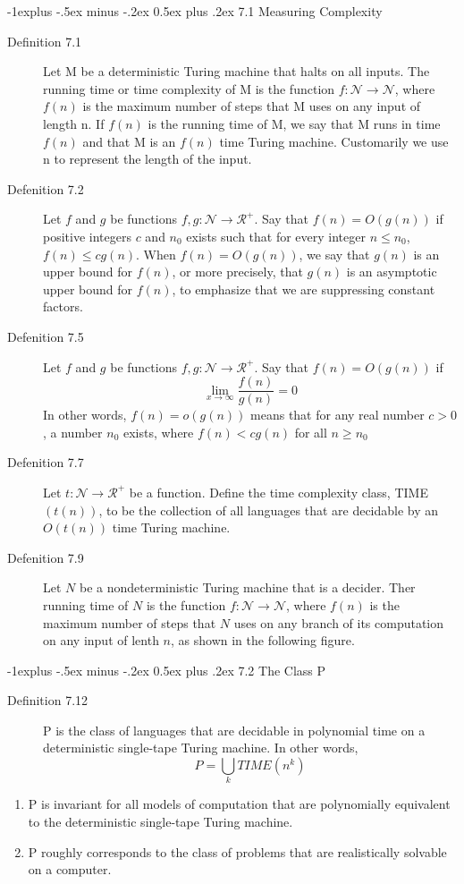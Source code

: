 \documentclass[10pt,landscape]{article}
\makeatletter
\renewcommand{\subsection}{\@startsection{subsection}{2}{0mm}%
                                {-1explus -.5ex minus -.2ex}%
                                {0.5ex plus .2ex}%
                                {\normalfont\normalsize\bfseries}}
\makeatother
\begin{document}
\begin{multicols}{3}
\subsection{7.1 Measuring Complexity}
\begin{description}
  \item[Definition 7.1] Let M be a deterministic Turing machine that halts on all inputs. The running time or time complexity of M is the function $f: \mathcal{N} \rightarrow \mathcal{N}$, where $f(n)$ is the maximum number of steps that M uses on any input of length n. If $f(n)$ is the running time of M, we say that M runs in time $f(n)$ and that M is an $f(n)$ time Turing machine. Customarily we use n to represent the length of the input. 
  \item[Defenition 7.2] Let $f$ and $g$ be functions $f,g: \mathcal{N} \rightarrow \mathcal{R}^{+}$. Say that $f(n) = O(g(n))$ if positive integers $c$ and $n_{0}$ exists such that for every integer $ n \leq n_{0}$, $f(n) \leq cg(n)$. When $f(n) = O(g(n))$, we say that $g(n)$ is an upper bound for $f(n)$, or more precisely, that $g(n)$ is an asymptotic upper bound for $f(n)$, to emphasize that we are suppressing constant factors. 
  \item[Defenition 7.5] Let $f$ and $g$ be functions $f,g: \mathcal{N} \rightarrow \mathcal{R}^{+}$. Say that $f(n) = O(g(n))$ if $$\lim_{x\to\infty} \frac{f(n)}{g(n)} = 0 $$ In other words, $f(n) = o(g(n))$ means that for any real number $c > 0$, a number $n_{0}$ exists, where $f(n) < cg(n)$ for all $n \geq n_{0}$
  \item[Defenition 7.7] Let $t:\mathcal{N} \rightarrow \mathcal{R}^{+}$ be a function. Define the time complexity class, TIME$(t(n))$, to be the collection of all languages that are decidable by an $O(t(n))$ time Turing machine.
  \item[Defenition 7.9] Let $N$ be a nondeterministic Turing machine that is a decider. Ther running time of $N$ is the function $f:\mathcal{N} \rightarrow \mathcal{N}$, where $f(n)$ is the maximum number of steps that $N$ uses on any branch of its computation on any input of lenth $n$, as shown in the following figure.
\end{description}

\subsection{7.2 The Class P}
\begin{description}
  \item[Definition 7.12] P is the class of languages that are decidable in polynomial time on a deterministic single-tape Turing machine. In other words, $$P = \bigcup_{k} TIME(n^{k})$$
\end{description}
\begin{enumerate}
  \item P is invariant for all models of computation that are polynomially equivalent to the deterministic single-tape Turing machine.
  \item P roughly corresponds to the class of problems that are realistically solvable on a computer. 
\end{enumerate}


\end{multicols}
\end{document}
